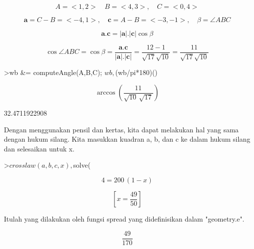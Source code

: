 \documentclass[12pt,Times new roman,letterpaper]{book}
\begin{document}
\begin{eulernootebook}
\begin{eulercomment}
\begin{eulercomment}
\begin{eulernootebook}
\begin{eulercomment}
\begin{eulercomment}
\begin{eulercomment}
\begin{eulercomment}
\begin{eulercomment}
\begin{eulercomment}
\begin{eulernotebook}
\begin{eulercomment}
\begin{eulercomment}
\begin{eulercomment}
\begin{eulercomment}
\end{eulercomment}
\begin{eulerformula}
\[
A=<1,2>\quad B=<4,3>,\quad C=<0,4>
\]
\end{eulerformula}
\begin{eulerformula}
\[
\mathbf{a}=C-B=<-4,1>,\quad \mathbf{c}=A-B=<-3,-1>,\quad \beta=\angle ABC
\]
\end{eulerformula}
\begin{eulerformula}
\[
\mathbf{a}.\mathbf{c}=|\mathbf{a}|.|\mathbf{c}|\cos \beta
\]
\end{eulerformula}
\begin{eulerformula}
\[
\cos \angle ABC =\cos\beta=\frac{\mathbf{a}.\mathbf{c}}{|\mathbf{a}|.|\mathbf{c}|}=\frac{12-1}{\sqrt{17}\sqrt{10}}=\frac{11}{\sqrt{17}\sqrt{10}}
\]
\end{eulerformula}
\begin{eulerprompt}
>wb &= computeAngle(A,B,C); $wb, $(wb/pi*180)()
\end{eulerprompt}
\begin{eulerformula}
\[
\arccos \left(\frac{11}{\sqrt{10}\,\sqrt{17}}\right)
\]
\end{eulerformula}
\begin{euleroutput}
  32.4711922908
\end{euleroutput}
\begin{eulercomment}
Dengan menggunakan pensil dan kertas, kita dapat melakukan hal yang
sama dengan hukum silang. Kita masukkan kuadran a, b, dan c ke dalam
hukum silang dan selesaikan untuk x.
\end{eulercomment}
\begin{eulerprompt}
>$crosslaw(a,b,c,x), $solve(%
\end{eulerprompt}
\begin{eulerformula}
\[
4=200\,\left(1-x\right)
\]
\end{eulerformula}
\begin{eulerformula}
\[
\left[ x=\frac{49}{50} \right] 
\]
\end{eulerformula}
\begin{eulercomment}
Itulah yang dilakukan oleh fungsi spread yang didefinisikan dalam
"geometry.e".
\end{eulercomment}
\begin{eulerformula}
\[
\frac{49}{170}
\]
\end{eulerformula}

\end{eulercomment}
\end{eulercomment}
\end{eulercomment}
\end{eulernotebook}
\end{eulercomment}
\end{eulercomment}
\end{eulercomment}
\end{eulercomment}
\end{eulercomment}
\end{eulercomment}
\end{eulernootebook}
\end{eulercomment}
\end{eulercomment}
\end{eulernootebook}
\end{document}
